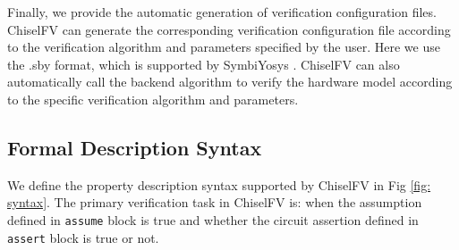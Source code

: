 \documentclass[conference]{IEEEtran}
\theoremstyle{definition}
\begin{document}
Finally, we provide the automatic generation of verification configuration files.
ChiselFV can generate the corresponding verification configuration file according to the verification algorithm and parameters specified by the user. Here we use the .sby format, which is supported by SymbiYosys \cite{SymbiYosys}. ChiselFV can also automatically call the backend algorithm to verify the hardware model according to the specific verification algorithm and parameters.

\subsection{Formal Description Syntax}

We define the property description syntax supported by ChiselFV in Fig \ref{fig: syntax}.
The primary verification task in ChiselFV is: when the assumption defined in \verb|assume| block is true and whether the circuit assertion defined in \verb|assert| block is true or not. 
\end{document}

